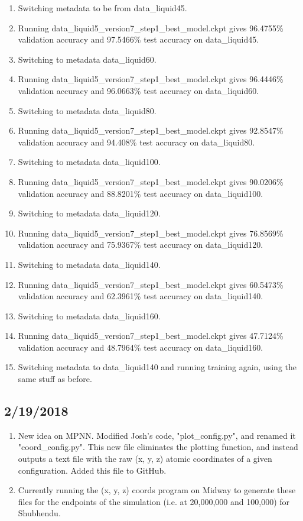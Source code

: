 \documentclass[12pt,reqno]{amsart}
\numberwithin{equation}{section}
\begin{document}
\begin{enumerate}
\item Switching metadata to be from data\_liquid45.  
\item Running data\_liquid5\_version7\_step1\_best\_model.ckpt gives 96.4755\% validation accuracy and 97.5466\% test accuracy on data\_liquid45.
\item Switching to metadata data\_liquid60.  
\item Running data\_liquid5\_version7\_step1\_best\_model.ckpt gives 96.4446\% validation accuracy and 96.0663\% test accuracy on data\_liquid60.
\item Switching to metadata data\_liquid80.  
\item Running data\_liquid5\_version7\_step1\_best\_model.ckpt gives 92.8547\% validation accuracy and 94.408\% test accuracy on data\_liquid80.
\item Switching to metadata data\_liquid100.  
\item Running data\_liquid5\_version7\_step1\_best\_model.ckpt gives 90.0206\% validation accuracy and 88.8201\% test accuracy on data\_liquid100.
\item Switching to metadata data\_liquid120.  
\item Running data\_liquid5\_version7\_step1\_best\_model.ckpt gives 76.8569\% validation accuracy and 75.9367\% test accuracy on data\_liquid120.
\item Switching to metadata data\_liquid140. 
\item Running data\_liquid5\_version7\_step1\_best\_model.ckpt gives 60.5473\% validation accuracy and 62.3961\% test accuracy on data\_liquid140.
\item Switching to metadata data\_liquid160. 
\item Running data\_liquid5\_version7\_step1\_best\_model.ckpt gives 47.7124\% validation accuracy and 48.7964\% test accuracy on data\_liquid160.
\item Switching metadata to data\_liquid140 and running training again, using the same stuff as before. 
\end{enumerate}

\subsection{2/19/2018}

\begin{enumerate}
\item New idea on MPNN.  Modified Josh's code, "plot\_config.py", and renamed it "coord\_config.py".  This new file eliminates the plotting function, and instead outputs a text file with the raw (x, y, z) atomic coordinates of a given configuration.  Added this file to GitHub.
\item Currently running the (x, y, z) coords program on Midway to generate these files for the endpoints of the simulation (i.e. at 20,000,000 and 100,000) for Shubhendu.  
\end{enumerate}
\end{document}
